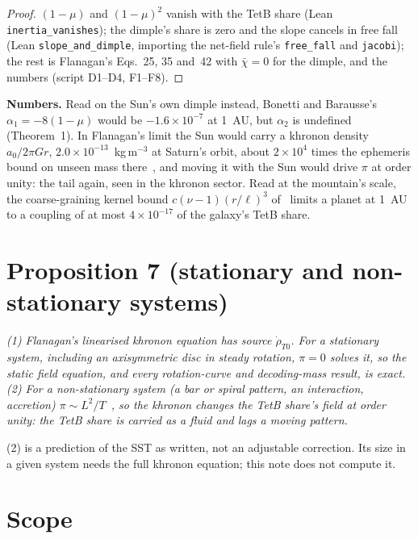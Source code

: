 \documentclass[twocolumn]{iopjournal}
\begin{document}
\begin{proof}
$(1-\mu)$ and $(1-\mu)^2$ vanish with the TetB share (Lean
\texttt{inertia\_vanishes}); the dimple's share is zero and the slope
cancels in free fall (Lean \texttt{slope\_and\_dimple}, importing the
net-field rule's \texttt{free\_fall} and \texttt{jacobi}); the rest is
Flanagan's Eqs.~25, 35 and~42 with $\bar\chi = 0$ for the dimple, and
the numbers (script D1--D4, F1--F8).
\end{proof}

\textbf{Numbers.} Read on the Sun's own dimple instead, Bonetti and
Barausse's $\alpha_1 = -8(1 - \mu)$ would be $-1.6\times10^{-7}$ at
1~AU, but $\alpha_2$ is undefined (Theorem~1). In Flanagan's limit the
Sun would carry a khronon density $a_0/2\pi Gr$,
$2.0\times10^{-13}$~kg\,m$^{-3}$ at Saturn's orbit, about $2\times10^4$
times the ephemeris bound on unseen mass there~\cite{Pitjev2013}, and
moving it with the Sun would drive $\pi$ at order unity: the tail
again, seen in the khronon sector. Read at the mountain's scale, the
coarse-graining kernel bound $c(\nu - 1)(r/\ell)^3$
of~\cite{NelsonNFR} limits a planet at 1~AU to a coupling of at most
$4\times10^{-17}$ of the galaxy's TetB share.


\section*{Proposition 7 (stationary and non-stationary systems)}

\emph{(1) Flanagan's linearised khronon equation has source
$\dot\rho_{T0}$. For a stationary system, including an axisymmetric
disc in steady rotation, $\pi = 0$ solves it, so the static field
equation, and every rotation-curve and decoding-mass result, is
exact. (2) For a non-stationary system (a bar or spiral pattern, an
interaction, accretion) $\pi \sim L^2/T$~\cite{Flanagan2023}, so the
khronon changes the TetB share's field at order unity: the TetB share
is carried as a fluid and lags a moving pattern.}

(2) is a prediction of the SST as written, not an adjustable
correction. Its size in a given system needs the full khronon
equation; this note does not compute it.


\section*{Scope}
\end{document}
